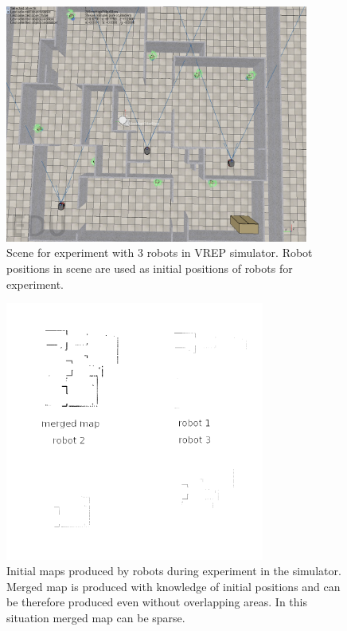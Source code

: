 \begin{figure}
    \centering
    \includegraphics[width=3.93in]{../img/minimal-overlapping-area-scene.png}
    \caption[Scene for experiment with $3$ robots.]{Scene for experiment with $3$ robots in \gls{VREP} simulator. Robot positions in scene are used as initial positions of robots for experiment.}
    \label{fig:minimal-overlapping-area-scene}
\end{figure}

\begin{figure}
    \centering
    \includegraphics[width=3.35in]{../img/merging-with-known-initial-positions-begin.png}
    \caption[Initial maps produced by robots in the simulator.]{Initial maps produced by robots during experiment in the simulator. Merged map is produced with knowledge of initial positions and can be therefore produced even without overlapping areas. In this situation merged map can be sparse.}
    \label{fig:merging-with-known-initial-positions-begin}
\end{figure}

